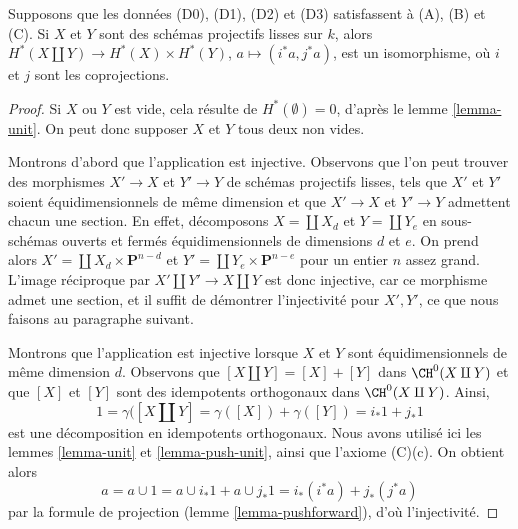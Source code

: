 \begin{lemma}
\label{lemma-weil-additive}
Supposons que les données (D0), (D1), (D2) et (D3) satisfassent à (A), (B) et (C).
Si $X$ et $Y$ sont des schémas projectifs lisses sur $k$, alors
$H^*(X \amalg Y) \to H^*(X) \times H^*(Y)$,
$a \mapsto (i^*a, j^*a)$, est un isomorphisme, où $i$ et $j$
sont les coprojections.
\end{lemma}

\begin{proof}
Si $X$ ou $Y$ est vide, cela résulte de
$H^*(\emptyset) = 0$, d'après le lemme \ref{lemma-unit}.
On peut donc supposer $X$ et $Y$ tous deux non vides.

\medskip\noindent
Montrons d'abord que l'application est injective. Observons que
l'on peut trouver des morphismes $X' \to X$ et $Y' \to Y$
de schémas projectifs lisses, tels que $X'$ et $Y'$ soient
équidimensionnels de même dimension et que
$X' \to X$ et $Y' \to Y$ admettent chacun une section. En effet,
décomposons $X = \coprod X_d$ et $Y = \coprod Y_e$
en sous-schémas ouverts et fermés équidimensionnels de
dimensions $d$ et $e$. On prend alors
$X' = \coprod X_d \times \mathbf{P}^{n - d}$
et $Y' = \coprod Y_e \times \mathbf{P}^{n - e}$ pour un entier
$n$ assez grand. L'image réciproque par
$X' \amalg Y' \to X \amalg Y$ est donc injective,
car ce morphisme admet une section, et
il suffit de démontrer l'injectivité pour $X', Y'$,
ce que nous faisons au paragraphe suivant.

\medskip\noindent
Montrons que l'application est injective lorsque $X$ et $Y$ sont équidimensionnels
de même dimension $d$.
Observons que $[X \amalg Y] = [X] + [Y]$ dans $\CH^0(X \amalg Y)$
et que $[X]$ et $[Y]$ sont des idempotents orthogonaux dans $\CH^0(X \amalg Y)$.
Ainsi,
$$
1 = \gamma([X \amalg Y] = \gamma([X]) + \gamma([Y]) = i_*1 + j_*1
$$
est une décomposition en idempotents orthogonaux. Nous avons utilisé ici
les lemmes \ref{lemma-unit} et \ref{lemma-push-unit}, ainsi que l'axiome (C)(c).
On obtient alors
$$
a = a \cup 1 = a \cup i_*1 + a \cup j_*1 =
i_*(i^*a) + j_*(j^*a)
$$
par la formule de projection (lemme \ref{lemma-pushforward}), d'où
l'injectivité.


\end{proof}
